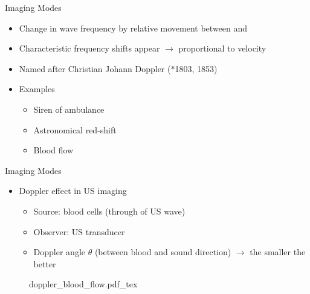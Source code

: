 \begin{frame}{Imaging Modes \cont}

    \begin{itemize}
        \setlength\itemsep{0.3cm}
        \item Change in wave frequency by relative movement between  and 
        \item Characteristic frequency shifts appear $\rightarrow$ proportional to velocity
        \item Named after Christian Johann Doppler ($\ast$1803, \textdagger{} 1853)
        \item Examples
              \begin{itemize}
                  \item Siren of ambulance
                  \item Astronomical red-shift
                  \item Blood flow
              \end{itemize}
    \end{itemize}

\end{frame}


\begin{frame}{Imaging Modes \cont}

    \begin{itemize}
        \item Doppler effect in US  imaging
              \begin{itemize}
                  \item Source:  blood cells (through  of US wave)
                  \item Observer: US transducer
                  \item Doppler angle $\theta$ (between blood and sound direction) $\rightarrow$ the smaller the better
              \end{itemize}
    \end{itemize}

    \begin{figure}
        \def\svgwidth{.9\linewidth}
        {doppler_blood_flow.pdf_tex}
    \end{figure}

\end{frame}



